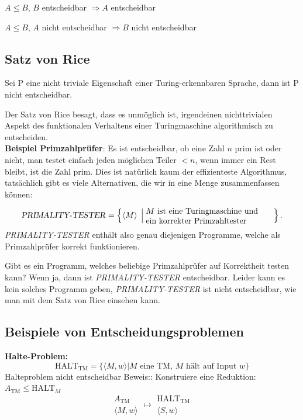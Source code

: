 \documentclass[a4paper]{article}
\begin{document}
	\begin{fsatz}
	$A \leq B$, $B$ entscheidbar $\Rightarrow A$ entscheidbar
	\end{fsatz}
	\begin{fsatz}
	$A \leq B$, $A$ nicht entscheidbar $\Rightarrow B$ nicht entscheidbar
	\end{fsatz}

\subsection{Satz von Rice}
	\begin{fsatz}
	Sei P eine nicht triviale Eigenschaft einer Turing-erkennbaren
	Sprache, dann ist P nicht entscheidbar.
	\end{fsatz}
	
	Der Satz von Rice besagt, dass es unmöglich ist, irgendeinen nichttrivialen Aspekt des funktionalen Verhaltens einer Turingmaschine algorithmisch zu entscheiden.
	\\
	
	\textbf{Beispiel Primzahlprüfer}: Es ist entscheidbar, ob eine Zahl $n$ prim ist oder
	nicht, man testet einfach jeden möglichen Teiler $< n$, wenn immer ein Rest bleibt,
	ist die Zahl prim.
	Dies ist natürlich kaum der effizienteste Algorithmus, tatsächlich gibt
	es viele Alternativen, die wir in eine Menge zusammenfassen können:

	\[
	\text{\textsl{PRIMALITY-TESTER}}=
	\left\{\langle M\rangle\;\left|\;
	\begin{minipage}{2.15truein}
	\raggedright
	$M$ ist eine Turingmaschine und\\
	ein korrekter Primzahltester
	\end{minipage}
	\right.\right\}.
	\]
	\textsl{PRIMALITY-TESTER} enthält also genau diejenigen Programme, welche
	als Primzahlprüfer korrekt funktionieren.
	
	Gibt es ein Programm, welches beliebige Primzahlprüfer auf Korrektheit
	testen kann? Wenn ja, dann ist \textsl{PRIMALITY-TESTER} entscheidbar.
	Leider kann es kein solches Programm geben,
	\textsl{PRIMALITY-TESTER} ist nicht entscheidbar, wie man mit dem Satz
	von Rice einsehen kann.

\subsection{Beispiele von Entscheidungsproblemen}
	\textbf{Halte-Problem:}
	$$\text{HALT}_{\text{TM}} = \{ \langle M,w \rangle | M \text{ eine TM, } M \text{ hält auf Input } w \}$$
	Halteproblem nicht entscheidbar
	Beweis:: Konstruiere eine Reduktion: $A_{\text{TM}} \leq \text{HALT}_{M}$
	$$\substack{
		A_{\text{TM}}\\
		\langle M,w \rangle 
	} \longmapsto \substack{
		\text{HALT}_{\text{TM}}\\ 
		\langle S,w \rangle 
	}$$
	
\end{document}
